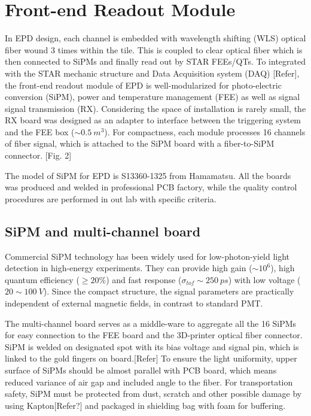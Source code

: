 \documentclass[11pt,a4paper]{article}
\begin{document}
\section{Front-end Readout Module}
In EPD design, each channel is embedded with wavelength shifting (WLS) optical fiber wound 3 times within the tile. This is coupled to clear optical fiber which is then connected to SiPMs and finally read out by STAR FEEs/QTs.
To integrated with the STAR mechanic structure and Data Acquisition system (DAQ) [Refer], the front-end readout module of EPD is well-modularized for photo-electric conversion (SiPM), power and temperature management (FEE) as well as signal signal transmission (RX).
Considering the space of installation is rarely small, the RX board was designed as an adapter to interface between the triggering system and the FEE box ($\sim 0.5~m^3$).
For compactness, each module processes 16 channels of fiber signal, which is  attached to the SiPM board with a fiber-to-SiPM connector. [Fig. 2]

The model of SiPM for EPD is S13360-1325 from Hamamatsu. All the boards was produced and welded in professional PCB factory, while the quality control procedures are performed in out lab with specific criteria. 

\subsection{SiPM and multi-channel board}
Commercial SiPM technology has been widely used for low-photon-yield light detection in high-energy experiments. They can provide high gain ($\sim10^{6}$), high quantum efficiency ($\geq20\%$) and fast response ($\sigma_{tof}\sim250~ps$) with low voltage  ($20\sim100~V$). Since the compact structure, the signal parameters are practically independent of external magnetic fields, in contrast to standard PMT.

The multi-channel board serves as a middle-ware to aggregate all the 16 SiPMs for easy connection to the FEE board and the 3D-printer optical fiber connector. SiPM is welded on designated spot with its bias voltage and signal pin, which is linked to the gold fingers on board.[Refer] To ensure the light uniformity, upper surface of SiPMs should be almost parallel with PCB board, which means reduced variance of air gap and included angle to the fiber. For transportation safety, SiPM must be protected from dust, scratch and other possible damage by using Kapton[Refer?] and packaged in shielding bag with foam for buffering.
\end{document}
